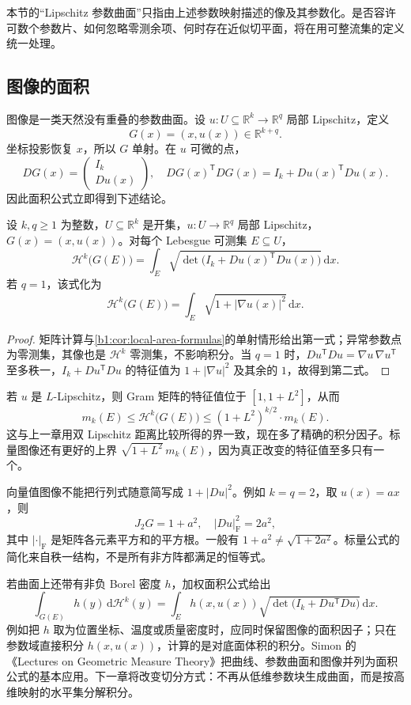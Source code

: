 \ProseParagraphBreak

本节的“Lipschitz 参数曲面”只指由上述参数映射描述的像及其参数化。是否容许可数个参数片、如何忽略零测余项、何时存在近似切平面，将在用可整流集的定义统一处理。

\subsection{图像的面积}
\label{b1:subsec:170404}

图像是一类天然没有重叠的参数曲面。设 \(u:U\subseteq\mathbb R^k\to\mathbb R^q\) 局部 Lipschitz，定义
\[
 G(x)=(x,u(x))\in\mathbb R^{k+q}.
\]
坐标投影恢复 \(x\)，所以 \(G\) 单射。在 \(u\) 可微的点，
\[
 DG(x)=\begin{pmatrix}I_k\\Du(x)\end{pmatrix},
 \quad DG(x)^{\mathsf T}DG(x)=I_k+Du(x)^{\mathsf T}Du(x).
\]
因此面积公式立即得到下述结论。

\begin{theorem}[图像面积公式]\label{b1:thm:graph-area-formula}
设 \(k,q\ge1\) 为整数，\(U\subseteq\mathbb R^k\) 是开集，\(u:U\to\mathbb R^q\) 局部 Lipschitz，\(G(x)=(x,u(x))\)。对每个 Lebesgue 可测集 \(E\subseteq U\)，
\[
 \mathcal H^k\bigl(G(E)\bigr)
 =\int_E\sqrt{\det\bigl(I_k+Du(x)^{\mathsf T}Du(x)\bigr)}\,\mathrm dx.
\]
若 \(q=1\)，该式化为
\[
 \mathcal H^k\bigl(G(E)\bigr)
 =\int_E\sqrt{1+|\nabla u(x)|^2}\,\mathrm dx.
\]
\end{theorem}
\begin{proof}
矩阵计算与\cref{b1:cor:local-area-formulas}的单射情形给出第一式；异常参数点为零测集，其像也是 \(\mathcal H^k\) 零测集，不影响积分。当 \(q=1\) 时，\(Du^{\mathsf T}Du=\nabla u\,\nabla u^{\mathsf T}\) 至多秩一，\(I_k+Du^{\mathsf T}Du\) 的特征值为 \(1+|\nabla u|^2\) 及其余的 \(1\)，故得到第二式。
\end{proof}

若 \(u\) 是 \(L\)-Lipschitz，则 Gram 矩阵的特征值位于 \([1,1+L^2]\)，从而
\[
 m_k(E)\leq\mathcal H^k\bigl(G(E)\bigr)
 \leq(1+L^2)^{k/2}\cdot m_k(E).
\]
这与上一章用双 Lipschitz 距离比较所得的界一致，现在多了精确的积分因子。标量图像还有更好的上界 \(\sqrt{1+L^2}\,m_k(E)\)，因为真正改变的特征值至多只有一个。

\ProseParagraphBreak

向量值图像不能把行列式随意简写成 \(1+|Du|^2\)。例如 \(k=q=2\)，取 \(u(x)=ax\)，则
\[
 J_2G=1+a^2,
 \quad |Du|_{\mathrm F}^2=2a^2,
\]
其中 \(|\cdot|_{\mathrm F}\) 是矩阵各元素平方和的平方根。一般有 \(1+a^2\ne\sqrt{1+2a^2}\)。标量公式的简化来自秩一结构，不是所有非方阵都满足的恒等式。

\ProseParagraphBreak

若曲面上还带有非负 Borel 密度 \(h\)，加权面积公式给出
\[
 \int_{G(E)}h(y)\,\mathrm d\mathcal H^k(y)
 =\int_Eh(x,u(x))
       \sqrt{\det\bigl(I_k+Du^{\mathsf T}Du\bigr)}\,\mathrm dx.
\]
例如把 \(h\) 取为位置坐标、温度或质量密度时，应同时保留图像的面积因子；只在参数域直接积分 \(h(x,u(x))\)，计算的是对底面体积的积分。Simon 的《Lectures on Geometric Measure Theory》\cite[8.6 EXAMPLES]{Simon1983Lectures}把曲线、参数曲面和图像并列为面积公式的基本应用。下一章将改变切分方式：不再从低维参数块生成曲面，而是按高维映射的水平集分解积分。
